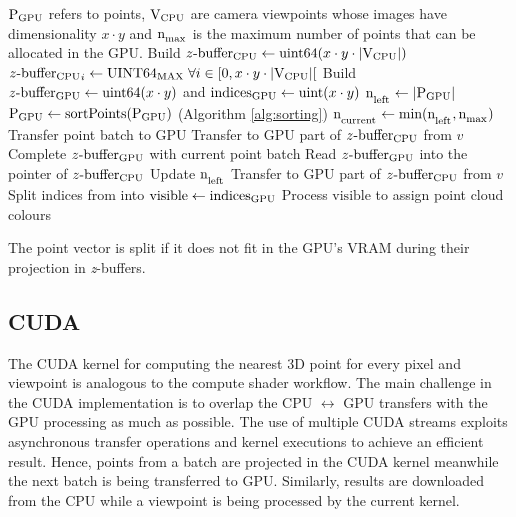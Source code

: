 \begin{algorithm}
  \begin{algorithmic}[1]
    \State $\textrm{P}\textsubscript{GPU}$ refers to points, $\textrm{V}\textsubscript{CPU}$ are camera viewpoints whose images have dimensionality $x \cdot y$ and $\textrm{n}_\textsubscript{max}$ is the maximum number of points that can be allocated in the GPU. %
    \State Build $z\textrm{-buffer}\textsubscript{CPU} \gets \textrm{uint64}(x \cdot y \cdot |\textrm{V}\textsubscript{CPU}|)$ %
    \State $z\textrm{-buffer}\textsubscript{CPU}_{i} \gets \textrm{UINT64\textsubscript{MAX}} \hspace{1mm} \forall i \in \left[0, x \cdot y \cdot |\textrm{V}\textsubscript{CPU}|\right[$ %
    \State Build $z\textrm{-buffer}\textsubscript{GPU} \gets \textrm{uint64}(x \cdot y)$ and $\textrm{indices}\textsubscript{GPU} \gets \textrm{uint}(x \cdot y)$ %
    \State $\textrm{n}_\textsubscript{left} \gets |\textrm{P}\textsubscript{GPU}|$ %
        \State $\textrm{P}\textsubscript{GPU} \gets \textrm{sortPoints}(\textrm{P}\textsubscript{GPU})$   \Comment(Algorithm \ref{alg:sorting}) %
    \EndIf
        \State $\textrm{n}_\textsubscript{current} \gets \textrm{min}(\textrm{n}_\textsubscript{left}, \textrm{n}_\textsubscript{max})$ %
        \State Transfer point batch to GPU %
            \State Transfer to GPU part of $z\textrm{-buffer}\textsubscript{CPU}$ from $v$ %
            \State Complete $z\textrm{-buffer}\textsubscript{GPU}$ with current point batch %
            \State Read $z\textrm{-buffer}\textsubscript{GPU}$ into the pointer of $z\textrm{-buffer}\textsubscript{CPU}$ %
        \EndFor
        \State Update $\textrm{n}_\textsubscript{left}$ %
    \EndWhile
        \State Transfer to GPU part of $z\textrm{-buffer}\textsubscript{CPU}$ from $v$ %
        \State Split indices from \Zbuffer into \Indices %
        \State $\textrm{visible} \gets \textrm{indices}\textsubscript{GPU}$ %
        \State Process $\textrm{visible}$ to assign point cloud colours %
    \EndFor
    \caption{The point vector is split if it does not fit in the GPU's VRAM during their projection in \textit{z}-buffers.}
    \label{alg:gpu_multiple_batch}
  \end{algorithmic}
\end{algorithm}

\subsection{CUDA}

The CUDA kernel for computing the nearest 3D point for every pixel and viewpoint is analogous to the compute shader workflow. The main challenge in the CUDA implementation is to overlap the CPU $\leftrightarrow$ GPU transfers with the GPU processing as much as possible. The use of multiple CUDA streams exploits asynchronous transfer operations and kernel executions to achieve an efficient result. Hence, points from a batch are projected in the CUDA kernel meanwhile the next batch is being transferred to GPU. Similarly, results are downloaded from the CPU while a viewpoint is being processed by the current kernel.

